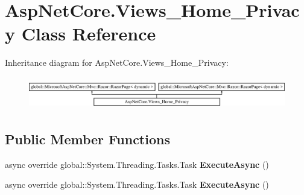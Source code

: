 \hypertarget{class_asp_net_core_1_1_views___home___privacy}{}\section{Asp\+Net\+Core.\+Views\+\_\+\+Home\+\_\+\+Privacy Class Reference}
\label{class_asp_net_core_1_1_views___home___privacy}
Inheritance diagram for Asp\+Net\+Core.\+Views\+\_\+\+Home\+\_\+\+Privacy\+:\begin{figure}[H]
\begin{center}
\leavevmode
\includegraphics[height=1.432225cm]{class_asp_net_core_1_1_views___home___privacy}
\end{center}
\end{figure}
\subsection*{Public Member Functions}
\begin{DoxyCompactItemize}
\item 
\mbox{\label{class_asp_net_core_1_1_views___home___privacy_a682549ce8097fa5a8b4e1629a32e5e93}} 
async override global\+::\+System.\+Threading.\+Tasks.\+Task {\bfseries Execute\+Async} ()
\item 
\mbox{\label{class_asp_net_core_1_1_views___home___privacy_a682549ce8097fa5a8b4e1629a32e5e93}} 
async override global\+::\+System.\+Threading.\+Tasks.\+Task {\bfseries Execute\+Async} ()
\end{DoxyCompactItemize}
